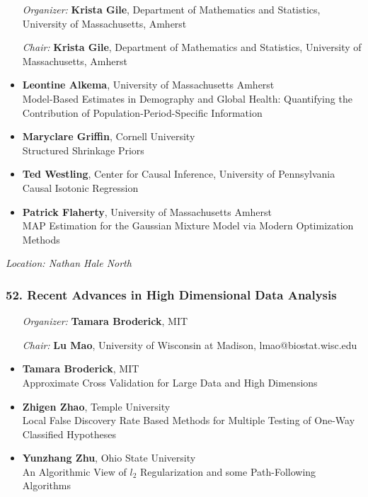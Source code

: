 \begin{enumerate}[align=left]
\item [\emph{Organizer:}] \textbf{Krista Gile}, Department of Mathematics and Statistics, University of Massachusetts, Amherst
\item [\emph{Chair:}] \textbf{Krista Gile}, Department of Mathematics and Statistics, University of Massachusetts, Amherst
\end{enumerate}

\begin{itemize}
\item \textbf{Leontine Alkema}, University of Massachusetts Amherst \\
Model-Based Estimates in Demography and Global Health: Quantifying the Contribution of Population-Period-Specific Information
\item \textbf{Maryclare Griffin}, Cornell University \\
Structured Shrinkage Priors
\item \textbf{Ted Westling}, Center for Causal Inference, University of Pennsylvania \\
Causal Isotonic Regression
\item \textbf{Patrick Flaherty}, University of Massachusetts Amherst \\
MAP Estimation for the Gaussian Mixture Model via Modern Optimization Methods
\end{itemize}

\emph{Location: Nathan Hale North}

\subsubsection*{52. Recent Advances in High Dimensional Data Analysis}

\begin{enumerate}[align=left]
\item [\emph{Organizer:}] \textbf{Tamara Broderick}, MIT
\item [\emph{Chair:}] \textbf{Lu Mao},  University of Wisconsin at Madison, lmao@biostat.wisc.edu
\end{enumerate}

\begin{itemize}
\item \textbf{Tamara Broderick}, MIT \\
Approximate Cross Validation for Large Data and High Dimensions
\item \textbf{Zhigen Zhao}, Temple University \\
Local False Discovery Rate Based Methods for Multiple Testing of One-Way Classified Hypotheses
\item \textbf{Yunzhang Zhu}, Ohio State University \\
An Algorithmic View of $l_2$ Regularization and some Path-Following Algorithms
\end{itemize}


